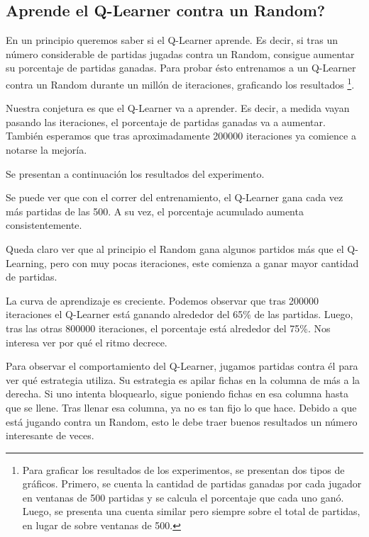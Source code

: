 \subsection{Aprende el Q-Learner contra un Random?}

En un principio queremos saber si el Q-Learner aprende. Es decir, si tras un número considerable de partidas jugadas contra un Random, consigue aumentar su porcentaje de partidas ganadas. Para probar ésto entrenamos a un Q-Learner contra un Random durante un millón de iteraciones, graficando los resultados \footnote{Para graficar los resultados de los experimentos, se presentan dos tipos de gráficos. Primero, se cuenta la cantidad de partidas ganadas por cada jugador en ventanas de 500 partidas y se calcula el porcentaje que cada uno ganó. Luego, se presenta una cuenta similar pero siempre sobre el total de partidas, en lugar de sobre ventanas de 500.}.

Nuestra conjetura es que el Q-Learner va a aprender. Es decir, a medida vayan pasando las iteraciones, el porcentaje de partidas ganadas va a aumentar. También esperamos que tras aproximadamente 200000 iteraciones ya comience a notarse la mejoría.

Se presentan a continuación los resultados del experimento.



Se puede ver que con el correr del entrenamiento, el Q-Learner gana cada vez m\'as partidas de las 500. A su vez, el porcentaje acumulado aumenta consistentemente.

Queda claro ver que al principio el Random gana algunos partidos m\'as que el Q-Learning, pero con muy pocas iteraciones, este comienza a ganar mayor cantidad de partidas.

La curva de aprendizaje es creciente. Podemos observar que tras 200000 iteraciones el Q-Learner está ganando alrededor del 65\% de las partidas. Luego, tras las otras 800000 iteraciones, el porcentaje está alrededor del 75\%. Nos interesa ver por qué el ritmo decrece.

Para observar el comportamiento del Q-Learner, jugamos partidas contra él para ver qué estrategia utiliza. Su estrategia es apilar fichas en la columna de más a la derecha. Si uno intenta bloquearlo, sigue poniendo fichas en esa columna hasta que se llene. Tras llenar esa columna, ya no es tan fijo lo que hace. Debido a que está jugando contra un Random, esto le debe traer buenos resultados un número interesante de veces.


